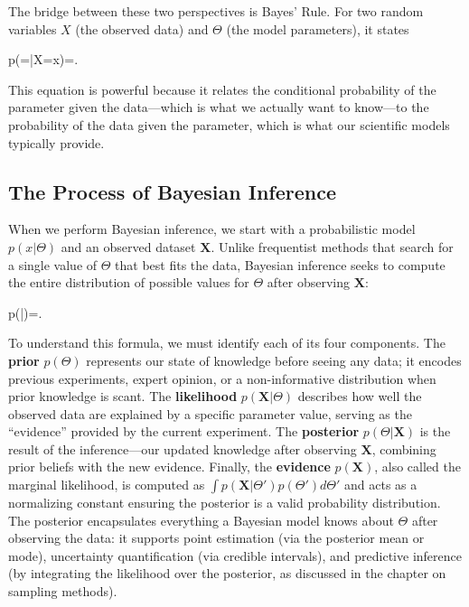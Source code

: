 The bridge between these two perspectives is \alert{Bayes' Rule}. For two random variables $X$ (the observed data) and $\Theta$ (the model parameters), it states
\begin{myequation}
p(\Theta=\theta|X=x)=.
\end{myequation}
This equation is powerful because it relates the conditional probability of the parameter given the data---which is what we actually want to know---to the probability of the data given the parameter, which is what our scientific models typically provide.

\subsection*{The Process of Bayesian Inference}

When we perform Bayesian inference, we start with a probabilistic model $p(x|\Theta)$ and an observed dataset $\mathbf{X}$. Unlike frequentist methods that search for a single value of $\Theta$ that best fits the data, Bayesian inference seeks to compute the entire distribution of possible values for $\Theta$ after observing $\mathbf{X}$:
\begin{myequation}
p(\Theta|)=.
\end{myequation}
To understand this formula, we must identify each of its four components. The \textbf{prior} $p(\Theta)$ represents our state of knowledge \alert{before} seeing any data; it encodes previous experiments, expert opinion, or a non-informative distribution when prior knowledge is scant. The \textbf{likelihood} $p(\mathbf{X}|\Theta)$ describes how well the observed data are explained by a specific parameter value, serving as the ``evidence'' provided by the current experiment. The \textbf{posterior} $p(\Theta|\mathbf{X})$ is the result of the inference---our updated knowledge \alert{after} observing $\mathbf{X}$, combining prior beliefs with the new evidence. Finally, the \textbf{evidence} $p(\mathbf{X})$, also called the marginal likelihood, is computed as $\int p(\mathbf{X}|\Theta')p(\Theta')d\Theta'$ and acts as a normalizing constant ensuring the posterior is a valid probability distribution. The posterior encapsulates everything a Bayesian model knows about $\Theta$ after observing the data: it supports point estimation (via the posterior mean or mode), uncertainty quantification (via credible intervals), and predictive inference (by integrating the likelihood over the posterior, as discussed in the chapter on sampling methods).

